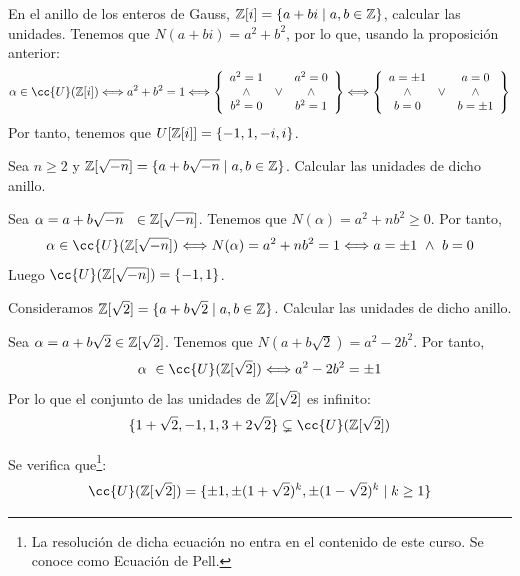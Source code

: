 \begin{ejemplo}
    En el anillo de los enteros de Gauss, $\mathbb Z[i] = \{a+bi \mid a,b \in \mathbb Z\}$, calcular las unidades. Tenemos que $N(a+bi) = a^2 + b^2$, por lo que, usando la proposición anterior:
    \begin{equation*}
        \alpha \in \cc{U}(\Z[i]) \Longleftrightarrow a^2 + b^2 = 1 \Longleftrightarrow \left\{ \begin{array}{ccc}
            a^2 = 1 &  & a^2 = 0 \\
            \land    &  \lor  &  \land       \\
            b^2 = 0 &  & b^2 = 1
        \end{array} \right\}
        \Longleftrightarrow \left\{ \begin{array}{ccc}
            a = \pm 1 & & a = 0     \\
            \land    &  \lor  &  \land \\
            b = 0     & & b = \pm 1
        \end{array} \right\}
    \end{equation*}
    Por tanto, tenemos que $U[\mathbb Z[i]] = \{-1, 1, -i, i\}$.
\end{ejemplo}

\begin{ejemplo}
    Sea $n \geq 2$ y $\mathbb Z[\sqrt{-n}] = \{a+b\sqrt{-n} \mid a,b \in \mathbb Z\}$. Calcular las unidades de dicho anillo.

    Sea $\alpha = a+b\sqrt{-n}~~\in \mathbb Z[\sqrt{-n}]$. Tenemos que $N(\alpha)=a^2+nb^2\geq 0$. Por tanto,
    $$\alpha \in \cc{U}(\Z[\sqrt{-n}]) \Longleftrightarrow N(\alpha) = a^2 + nb^2 = 1 \Longleftrightarrow a=\pm 1 \y b = 0$$
    Luego $\cc{U}(\Z[\sqrt{-n}]) = \{-1, 1\}$.
\end{ejemplo}

\begin{ejemplo}
    Consideramos $\mathbb Z[\sqrt{2}] = \{a+b\sqrt{2} \mid a,b \in \mathbb Z\}$. Calcular las unidades de dicho anillo.

    Sea $\alpha=a+b\sqrt{2} \in \mathbb Z[\sqrt{2}]$. Tenemos que $N(a+b\sqrt{2}) = a^2-2b^2$. Por tanto,
    $$\alpha~\in \cc{U}(\Z[\sqrt{2}]) \Longleftrightarrow a^2-2b^2 = \pm 1$$
    Por lo que el conjunto de las unidades de $\mathbb Z[\sqrt{2}]$ es infinito:
    $$\{1+\sqrt{2}, -1, 1, 3+2\sqrt{2}\}\subsetneq \cc{U}(\Z[\sqrt{2}])$$
    
    Se verifica que\footnote{La resolución de dicha ecuación no entra en el contenido de este curso. Se conoce como Ecuación de Pell.}:
    $$\cc{U}(\Z[\sqrt{2}]) = \{\pm 1, \pm (1+\sqrt{2})^k, \pm (1-\sqrt{2})^k\mid k\geq 1\}$$
\end{ejemplo}


